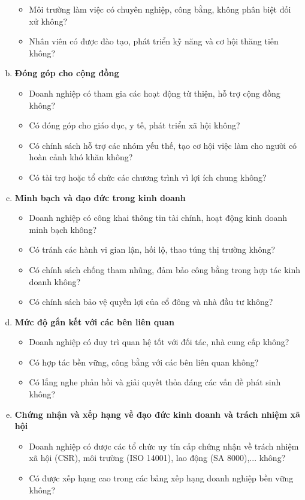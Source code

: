 \documentclass{article}
\begin{document}
\begin{enumerate}[a.]
\begin{itemize}
            \item Môi trường làm việc có chuyên nghiệp, công bằng, không phân biệt đối xử không?
            \item Nhân viên có được đào tạo, phát triển kỹ năng và cơ hội thăng tiến không?
        \end{itemize}
        \item \textbf{Đóng góp cho cộng đồng}
        \begin{itemize}
            \item Doanh nghiệp có tham gia các hoạt động từ thiện, hỗ trợ cộng đồng không?
            \item Có đóng góp cho giáo dục, y tế, phát triển xã hội không?
            \item Có chính sách hỗ trợ các nhóm yếu thế, tạo cơ hội việc làm cho người có hoàn cảnh khó khăn không?
            \item Có tài trợ hoặc tổ chức các chương trình vì lợi ích chung không?
        \end{itemize}
        \item \textbf{Minh bạch và đạo đức trong kinh doanh}
        \begin{itemize}
            \item Doanh nghiệp có công khai thông tin tài chính, hoạt động kinh doanh minh bạch không?
            \item Có tránh các hành vi gian lận, hối lộ, thao túng thị trường không?
            \item Có chính sách chống tham nhũng, đảm bảo công bằng trong hợp tác kinh doanh không?
            \item Có chính sách bảo vệ quyền lợi của cổ đông và nhà đầu tư không?
        \end{itemize}
        \item \textbf{Mức độ gắn kết với các bên liên quan}
        \begin{itemize}
            \item Doanh nghiệp có duy trì quan hệ tốt với đối tác, nhà cung cấp không?
            \item Có hợp tác bền vững, công bằng với các bên liên quan không?
            \item Có lắng nghe phản hồi và giải quyết thỏa đáng các vấn đề phát sinh không?
        \end{itemize}
        \item \textbf{Chứng nhận và xếp hạng về đạo đức kinh doanh và trách nhiệm xã hội}
        \begin{itemize}
            \item Doanh nghiệp có được các tổ chức uy tín cấp chứng nhận về trách nhiệm xã hội (CSR), môi trường (ISO 14001), lao động (SA 8000),... không?
            \item Có được xếp hạng cao trong các bảng xếp hạng doanh nghiệp bền vững không?
        \end{itemize}
    \end{enumerate}
\end{document}
